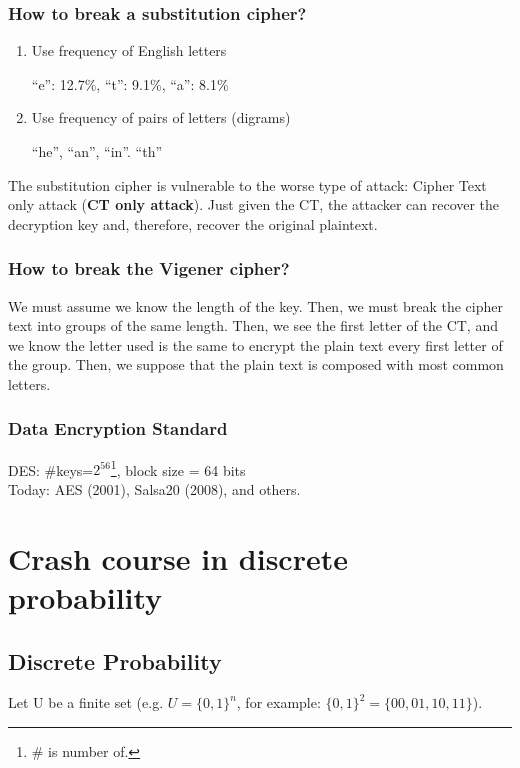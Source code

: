 \documentclass[12pt]{book}
\begin{document}
\subsubsection{How to break a substitution cipher?}
\begin{enumerate}
	\item Use frequency of English letters
	\begin{center}
		``e'': 12.7\%, ``t'': 9.1\%, ``a'': 8.1\%
	\end{center}
	\item Use frequency of pairs of letters (digrams)
	\begin{center}
		``he'', ``an'', ``in''. ``th''
	\end{center}
\end{enumerate}

The substitution cipher is vulnerable to the worse type of attack: Cipher Text only attack (\textbf{CT only attack}). Just given the CT,  the attacker can recover the decryption key and, therefore, recover the original plaintext.

\subsubsection{How to break the Vigener cipher?}
We must assume we know the length of the key. Then, we must break the cipher text into groups of the same length. Then, we see the first letter of the CT, and we know the letter used is the same to encrypt the plain text every first letter of the group. Then, we suppose that the plain text is composed with most common letters.

\subsubsection{Data Encryption Standard}
DES: \#keys=$2^{56}$\footnote{\# is number of.}, block size = 64 bits\\
Today: AES (2001), Salsa20 (2008), and others.

\newpage
\section{Crash course in discrete probability}
\subsection{Discrete Probability}
Let U be a finite set (e.g. $U=\{0,1\}^{n}$, for example: $\{0,1\}^{2}=\{00,01,10,11\}$).
\end{document}
